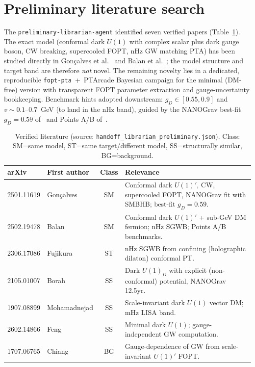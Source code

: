\documentclass[11pt]{article}
\newcommand{\gD}{g_D}
\begin{document}
\section{Preliminary literature search}
\label{sec:lit}
The \texttt{preliminary-librarian-agent} identified seven verified papers
(Table~\ref{tab:lit}). The exact model (conformal dark $U(1)$ with complex
scalar plus dark gauge boson, CW breaking, supercooled FOPT, nHz GW matching
PTA) has been studied directly in
Gon\c{c}alves et al.~\cite{Goncalves2025} and Balan et al.~\cite{Balan2025};
the model structure and target band are therefore \emph{not} novel. The
remaining novelty lies in a dedicated, reproducible \texttt{fopt-pta}~+~PTArcade
Bayesian campaign for the minimal (DM-free) version with transparent FOPT
parameter extraction and gauge-uncertainty bookkeeping. Benchmark hints adopted
downstream: $\gD\in[0.55,0.9]$ and $v\sim0.1$--$0.7$~GeV (to land in the nHz
band), guided by the NANOGrav best-fit $\gD=0.59$ of~\cite{Goncalves2025} and
Points A/B of~\cite{Balan2025}.

\begin{table}[ht]
\centering\small
\caption{Verified literature (source:
\texttt{handoff\_librarian\_preliminary.json}). Class:
SM=same model, ST=same target/different model, SS=structurally similar,
BG=background.}
\label{tab:lit}
\begin{tabular}{l l c p{}}
\toprule
arXiv & First author & Class & Relevance \\
\midrule
2501.11619 & Gon\c{c}alves & SM & Conformal dark $U(1)'$, CW, supercooled FOPT,
NANOGrav fit with SMBHB; best-fit $\gD=0.59$. \\
2502.19478 & Balan & SM & Conformal dark $U(1)'$ + sub-GeV DM fermion; nHz SGWB;
Points A/B benchmarks. \\
2306.17086 & Fujikura & ST & nHz SGWB from confining (holographic dilaton)
conformal PT. \\
2105.01007 & Borah & SS & Dark $U(1)_D$ with explicit (non-conformal) potential,
NANOGrav 12.5yr. \\
1907.08899 & Mohamadnejad & SS & Scale-invariant dark $U(1)$ vector DM; mHz LISA
band. \\
2602.14866 & Feng & SS & Minimal dark $U(1)$; gauge-independent GW computation. \\
1707.06765 & Chiang & BG & Gauge-dependence of GW from scale-invariant $U(1)'$
FOPT. \\
\bottomrule
\end{tabular}
\end{table}
\end{document}
